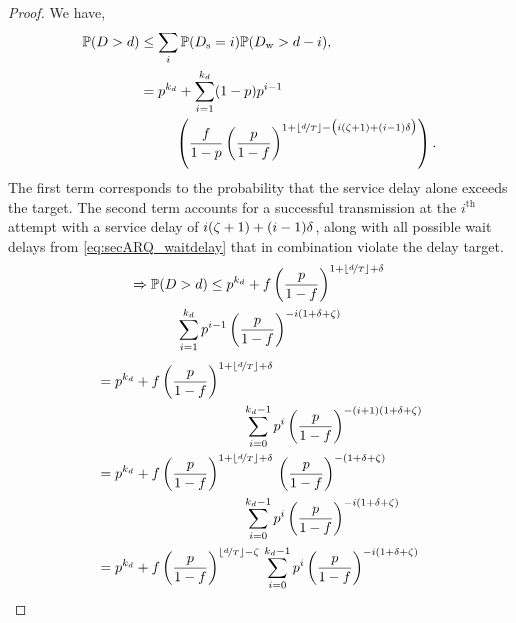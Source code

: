 \begin{proof}
We have,
\begin{align*}
\mathbb{P}(D >d)&\leq \sum_{i}\mathbb{P}(D_{\mathrm{s}} =i)\mathbb{P}(D_{\mathrm{w}} >d-i),\\
&= p^{k_d} + \sum_{i=1}^{{ k_d }} (1 - p) p^{i - 1}
\\&\hspace{2.5em}\left( \frac{f}{1-p}\left(\frac{p}{1-f}\right)^{1 + \left\lfloor\nicefrac{d}{T}\right\rfloor - \big(i({\zeta}+1) + (i - 1) {\delta}\big)}\right).
\end{align*}
The first term corresponds to the probability that the service delay alone exceeds the target. The second term accounts for a successful transmission at the $i^{\mathrm{th}}$ attempt with a service delay of $i({\zeta}+1) + (i-1)\delta$, along with all possible wait delays from \eqref{eq:secARQ_waitdelay} that in combination violate the delay target.
\begin{multline}
    \Rightarrow\mathbb{P}(D >d) \leq p^{k_d} + 
f\left(\frac{p}{1-f}\right)^{1 + \left\lfloor\nicefrac{d}{T}\right\rfloor + \delta}\,
\\\sum_{i=1}^{{ k_d }}p^{i - 1} \left(\frac{p}{1-f}\right)^{-i(1+\delta+{\zeta})}
\end{multline}
\begin{align*}
&= p^{k_d} + 
f\left(\frac{p}{1-f}\right)^{1 + \left\lfloor\nicefrac{d}{T}\right\rfloor + \delta}\,
\\&\hspace{10.5em}\sum_{i=0}^{{ k_d -1 }} p^{i} \left(\frac{p}{1-f}\right)^{-(i+1)(1+\delta+\ddecod)}\\
&= p^{k_d} + 
f\left(\frac{p}{1-f}\right)^{1 + \left\lfloor\nicefrac{d}{T}\right\rfloor + \delta}\,
\left(\frac{p}{1-f}\right)^{-(1+\delta+\ddecod)}\,
\\&\hspace{10.5em}\sum_{i=0}^{{ k_d -1 }} p^{i} \left(\frac{p}{1-f}\right)^{-i(1+\delta+\ddecod)}\\
&= p^{k_d} + 
f\left(\frac{p}{1-f}\right)^{ \left\lfloor\nicefrac{d}{T}\right\rfloor-\ddecod}\,
\sum_{i=0}^{{ k_d -1 }} p^{i} \left(\frac{p}{1-f}\right)^{-i(1+\delta+\ddecod)}\\

\end{align*}
\end{proof}
